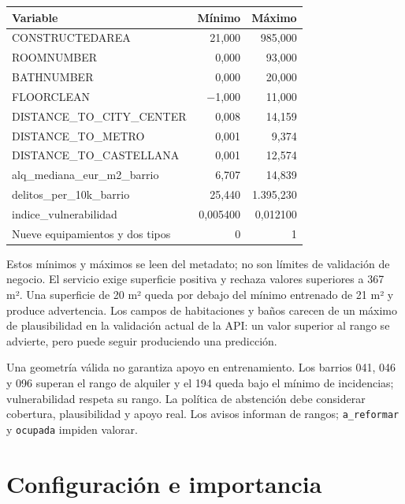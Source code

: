 \documentclass[11pt,a4paper]{article}
\newcommand{\thead}[1]{\textbf{#1}}
\newcounter{anexo}
\begin{document}
\begin{center}
\begin{tabularx}{\linewidth}{@{}L r r@{}}
\toprule
\thead{Variable} & \thead{Mínimo} & \thead{Máximo} \\
\midrule
CONSTRUCTEDAREA & 21,000 & 985,000 \\
ROOMNUMBER & 0,000 & 93,000 \\
BATHNUMBER & 0,000 & 20,000 \\
FLOORCLEAN & −1,000 & 11,000 \\
DISTANCE\_TO\_CITY\_CENTER & 0,008 & 14,159 \\
DISTANCE\_TO\_METRO & 0,001 & 9,374 \\
DISTANCE\_TO\_CASTELLANA & 0,001 & 12,574 \\
alq\_mediana\_eur\_m2\_barrio & 6,707 & 14,839 \\
delitos\_per\_10k\_barrio & 25,440 & 1.395,230 \\
indice\_vulnerabilidad & 0,005400 & 0,012100 \\
Nueve equipamientos y dos tipos & 0 & 1 \\
\bottomrule
\end{tabularx}
\end{center}

Estos mínimos y máximos se leen del metadato; no son límites de validación de negocio. El servicio exige superficie positiva y rechaza valores superiores a 367 m². Una superficie de 20 m² queda por debajo del mínimo entrenado de 21 m² y produce advertencia. Los campos de habitaciones y baños carecen de un máximo de plausibilidad en la validación actual de la API: un valor superior al rango se advierte, pero puede seguir produciendo una predicción.

Una geometría válida no garantiza apoyo en entrenamiento. Los barrios 041, 046 y 096 superan el rango de alquiler y el 194 queda bajo el mínimo de incidencias; vulnerabilidad respeta su rango. La política de abstención debe considerar cobertura, plausibilidad y apoyo real. Los avisos informan de rangos; \texttt{a\_reformar} y \texttt{ocupada} impiden valorar.

\clearpage{}\label{anx:\theanexo}%
\section*{\theanexo\hspace{0.6em}Configuración e importancia}
\end{document}
